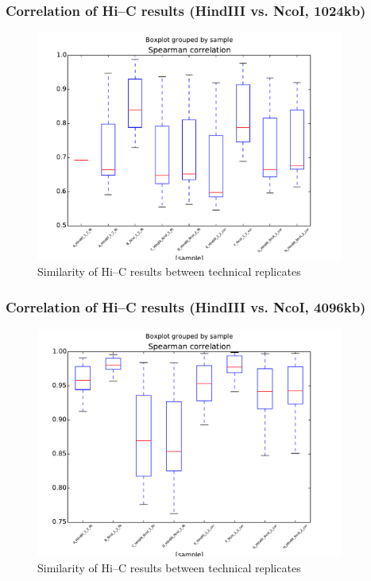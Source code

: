 \documentclass{beamer}
\begin{document}
\begin{frame}
\frametitle{ Correlation of Hi--C results (HindIII vs. NcoI, 1024kb)}
\begin{figure}[tb]
	\begin{center}
		\includegraphics[width=0.9\textwidth]{./Figures/1024_boxplot.pdf}
	\end{center}
	\caption{Similarity of Hi--C results between technical replicates}
	\label{fig:figure2}
\end{figure}
\end{frame}

\begin{frame}
\frametitle{Correlation of Hi--C results (HindIII vs. NcoI, 4096kb)}
\begin{figure}[tb]
	\begin{center}
		\includegraphics[width=0.9\textwidth]{./Figures/4096_boxplot.pdf}
	\end{center}
	\caption{Similarity of Hi--C results between technical replicates}
	\label{fig:figure2}
\end{figure}
\end{frame}
\end{document}

